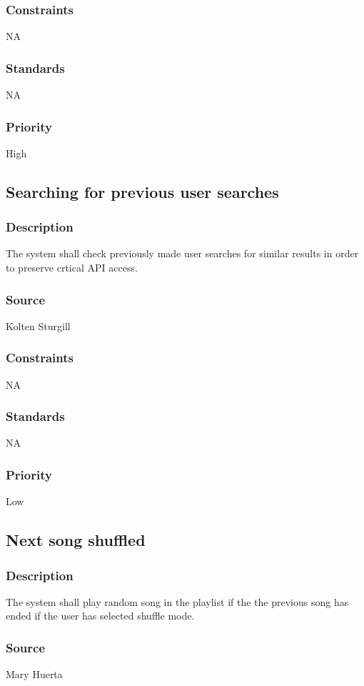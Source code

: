\subsubsection{Constraints}
NA
\subsubsection{Standards}
NA
\subsubsection{Priority}
High


\subsection{Searching for previous user searches}
\subsubsection{Description}
The system shall check previously made user searches for similar results in order to preserve crtical API access.
\subsubsection{Source}
Kolten Sturgill
\subsubsection{Constraints}
NA
\subsubsection{Standards}
NA
\subsubsection{Priority}
Low



\subsection{Next song shuffled}
\subsubsection{Description}
The system shall play random song in the playlist if the the previous song has ended if the user has selected shuffle mode.
\subsubsection{Source}
Mary Huerta
